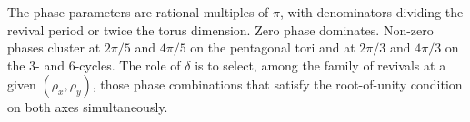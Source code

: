 \par
The phase parameters are rational multiples of $\pi$, with
denominators dividing the revival period or twice the torus
dimension. Zero phase dominates. Non-zero phases cluster at
$2\pi/5$ and $4\pi/5$ on the pentagonal tori and at $2\pi/3$ and
$4\pi/3$ on the $3$- and $6$-cycles. The role of $\delta$ is to
select, among the family of revivals at a given
$(\rho_x, \rho_y)$, those phase combinations that satisfy the
root-of-unity condition on both axes simultaneously.
